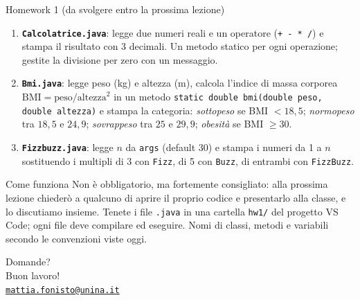 \documentclass[10pt,aspectratio=169]{beamer}
\begin{document}
\begin{frame}{Homework 1 (da svolgere entro la prossima lezione)}
\begin{enumerate}
    \item \textbf{\texttt{Calcolatrice.java}}: legge due numeri reali e un operatore (\texttt{+ - * /}) e stampa il risultato con 3 decimali. Un metodo statico per ogni operazione; gestite la divisione per zero con un messaggio.
    \item \textbf{\texttt{Bmi.java}}: legge peso (kg) e altezza (m), calcola l'indice di massa corporea $\text{BMI} = \text{peso} / \text{altezza}^2$ in un metodo \texttt{static double bmi(double peso, double altezza)} e stampa la categoria: \emph{sottopeso} se BMI $< 18{,}5$; \emph{normopeso} tra $18{,}5$ e $24{,}9$; \emph{sovrappeso} tra $25$ e $29{,}9$; \emph{obesità} se BMI $\geq 30$.
    \item \textbf{\texttt{Fizzbuzz.java}}: legge $n$ da \texttt{args} (default 30) e stampa i numeri da 1 a $n$ sostituendo i multipli di 3 con \texttt{Fizz}, di 5 con \texttt{Buzz}, di entrambi con \texttt{FizzBuzz}.
\end{enumerate}

\vspace{0.2cm}
\begin{block}{Come funziona}
Non è obbligatorio, ma fortemente consigliato: alla prossima lezione chiederò a qualcuno di aprire il proprio codice e presentarlo alla classe, e lo discutiamo insieme. Tenete i file \texttt{.java} in una cartella \texttt{hw1/} del progetto VS Code; ogni file deve compilare ed eseguire. Nomi di classi, metodi e variabili secondo le convenzioni viste oggi.
\end{block}
\end{frame}

\begin{frame}
\begin{center}
{\Huge Domande?}\\[1.5em]
{\Large Buon lavoro!}\\[2em]
{\normalsize \href{mailto:mattia.fonisto@unina.it}{\texttt{mattia.fonisto@unina.it}}}
\end{center}
\end{frame}
\end{document}
